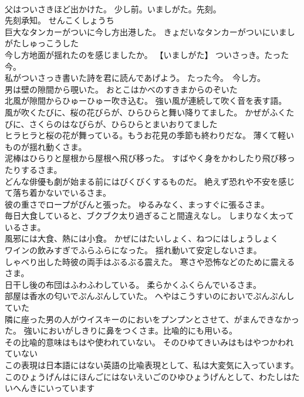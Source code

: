 \documentclass[8pt]{extreport}
\begin{document}
\begin{CJK}{UTF8}{min}
\\	父はついさきほど出かけた。	少し前。いましがた。先刻。
\\	先刻承知。	せんこくしょうち 
\\	巨大なタンカーがついに今し方出港した。	きょだいなタンカーがついにいましがたしゅっこうした 
\\	今し方地面が揺れたのを感じましたか。	【いましがた】 ついさっき。たった今。
\\	私がついさっき書いた詩を君に読んであげよう。	たった今。　今し方。
\\	男は壁の隙間から覗いた。	おとこはかべのすきまからのぞいた 
\\	北風が隙間からひゅーひゅー吹き込む。	強い風が連続して吹く音を表す語。
\\	風が吹くたびに、桜の花びらが、ひらひらと舞い降りてました。	かぜがふくたびに、さくらのはなびらが、ひらひらとまいおりてました 
\\	ヒラヒラと桜の花が舞っている。もうお花見の季節も終わりだな。	薄くて軽いものが揺れ動くさま。
\\	泥棒はひらりと屋根から屋根へ飛び移った。	すばやく身をかわしたり飛び移ったりするさま。
\\	どんな俳優も劇が始まる前にはびくびくするものだ。	絶えず恐れや不安を感じて落ち着かないでいるさま。
\\	彼の重さでロープがぴんと張った。	ゆるみなく、まっすぐに張るさま。
\\	毎日大食していると、ブクブク太り過ぎること間違えなし。	しまりなく太っているさま。
\\	風邪には大食、熱には小食。	かぜにはたいしょく、ねつにはしょうしょく 
\\	ワインの飲みすぎでふらふらになった。	揺れ動いて安定しないさま。
\\	しゃべり出した時彼の両手はぶるぶる震えた。	寒さや恐怖などのために震えるさま。
\\	日干し後の布団はふわふわしている。	柔らかくふくらんでいるさま。
\\	部屋は香水の匂いでぷんぷんしていた。	へやはこうすいのにおいでぷんぷんしていた 
\\	隣に座った男の人がウイスキーのにおいをプンプンとさせて、がまんできなかった。	強いにおいがしきりに鼻をつくさま。比喩的にも用いる。
\\	その比喩的意味はもはや使われていない。	そのひゆてきいみはもはやつかわれていない 
\\	この表現は日本語にはない英語の比喩表現として、私は大変気に入っています。	このひょうげんはにほんごにはないえいごのひゆひょうげんとして、わたしはたいへんきにいっています 

\end{CJK}
\end{document}

